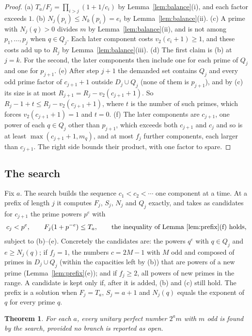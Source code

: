 \documentclass[11pt]{amsart}
\theoremstyle{plain}
\newtheorem{theorem}{Theorem}
\theoremstyle{definition}
\begin{document}
\begin{proof}
(a) $T_a/F_j=\prod_{i>j}(1+1/c_i)$ by Lemma~\ref{lem:balance}(i), and each
factor exceeds $1$.  (b) $N_j(p_i)\le N_k(p_i)=e_i$ by
Lemma~\ref{lem:balance}(ii).  (c) A prime with $N_j(q)>0$ divides $m$ by
Lemma~\ref{lem:balance}(ii), and is not among $p_1,\dots,p_j$ when $q\in Q_j$.
Each later component costs $v_2(c_i+1)\ge1$, and these costs add up to $R_j$
by Lemma~\ref{lem:balance}(iii).  (d) The first claim is (b) at $j=k$. For the
second, the later components then include one for each prime of $Q_j$ and one
for $p_{j+1}$.  (e) After step $j+1$ the demanded set contains $Q_j$ and every
odd prime factor of $c_{j+1}+1$ outside $D_j\cup Q_j$ (none of them is
$p_{j+1}$), and by (c) its size is at most
$R_{j+1}=R_j-v_2(c_{j+1}+1)$.  So $R_j-1+t\le R_j-v_2(c_{j+1}+1)$, where $t$ is
the number of such primes, which forces $v_2(c_{j+1}+1)=1$ and $t=0$.
(f) The later components are $c_{j+1}$, one power of each $q\in Q_j$ other
than $p_{j+1}$, which exceeds both $c_{j+1}$ and $c_j$ and so is at least
$\max(c_{j+1}+1,m_q)$, and at most $f_j$ further components, each larger than
$c_{j+1}$.  The right side bounds their product, with one factor to spare.
\end{proof}

\subsection{The search}
Fix $a$.  The search builds the sequence $c_1<c_2<\cdots$ one component at
a time.  At a prefix of length $j$ it computes $F_j$, $S_j$, $N_j$ and $Q_j$
exactly, and takes as candidates for $c_{j+1}$ the prime powers $p^e$ with
\[
c_j<p^e,\qquad F_j(1+p^{-e})\le T_a,\qquad
\text{the inequality of Lemma~\ref{lem:prefix}(f) holds},
\]
subject to (b)--(e).  Concretely the candidates are: the powers $q^e$ with
$q\in Q_j$ and $e\ge N_j(q)$; if $f_j=1$, the numbers $c=2M-1$ with $M$ odd and
composed of primes in $D_j\cup Q_j$ (within the capacities left by (b)) that are
powers of a new prime (Lemma~\ref{lem:prefix}(e)); and if $f_j\ge2$, all powers
of new primes in the range.  A candidate is kept only if, after it is added,
(b) and (c) still hold.  The prefix is a solution when $F_j=T_a$,
$S_j=a+1$ and $N_j(q)$ equals the exponent of $q$ for every prime $q$.

\begin{theorem}\label{thm:complete}
For each $a$, every unitary perfect number $2^a m$ with $m$ odd is found by the
search, provided no branch is reported as open.
\end{theorem}
\end{document}
